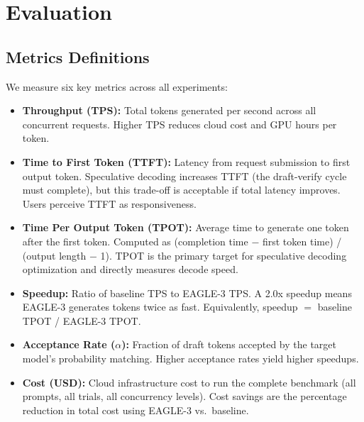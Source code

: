 \documentclass[10pt,twocolumn]{article}
\begin{document}
\section{Evaluation}
\label{sec:eval}
\subsection{Metrics Definitions}
\label{sec:metrics}

We measure six key metrics across all experiments:

\begin{itemize}[leftmargin=1.2em,itemsep=2pt]
  \item \textbf{Throughput (TPS):} Total tokens generated per second across all concurrent requests.
        Higher TPS reduces cloud cost and GPU hours per token.
  
  \item \textbf{Time to First Token (TTFT):} Latency from request submission to first output token.
        Speculative decoding increases TTFT (the draft-verify cycle must complete), but this trade-off is
        acceptable if total latency improves. Users perceive TTFT as responsiveness.
  
  \item \textbf{Time Per Output Token (TPOT):} Average time to generate one token after the first token.
        Computed as (completion time $-$ first token time) / (output length $-$ 1). TPOT is the primary target
        for speculative decoding optimization and directly measures decode speed.
  
  \item \textbf{Speedup:} Ratio of baseline TPS to EAGLE-3 TPS. A 2.0x speedup means EAGLE-3 generates
        tokens twice as fast. Equivalently, speedup $=$ baseline TPOT / EAGLE-3 TPOT.
  
  \item \textbf{Acceptance Rate ($\alpha$):} Fraction of draft tokens accepted by the target model's probability
        matching. Higher acceptance rates yield higher speedups. 
  
  \item \textbf{Cost (USD):} Cloud infrastructure cost to run the complete benchmark (all prompts, all trials,
        all concurrency levels). Cost savings are the percentage reduction in total cost using EAGLE-3 vs.~baseline.
\end{itemize}
\end{document}
